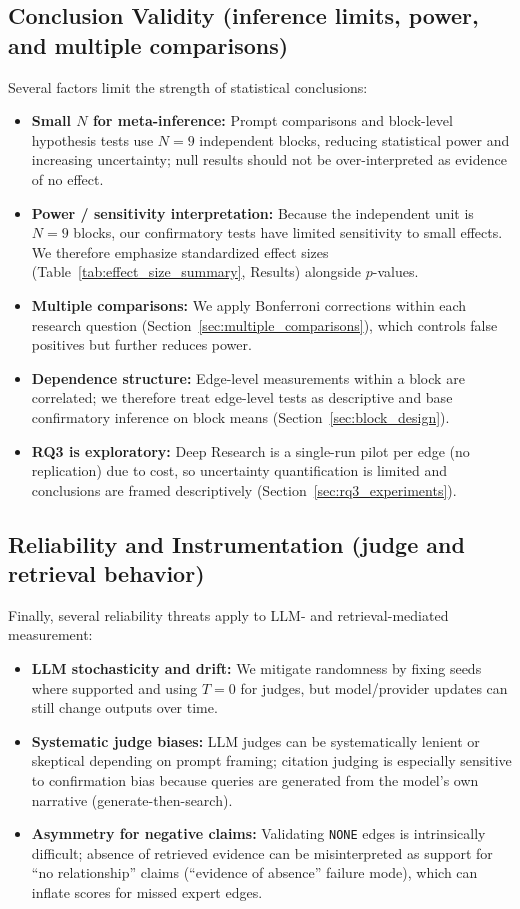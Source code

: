 \subsection{Conclusion Validity (inference limits, power, and multiple comparisons)}
Several factors limit the strength of statistical conclusions:
\begin{itemize}[noitemsep]
    \item \textbf{Small $N$ for meta-inference:} Prompt comparisons and block-level hypothesis tests use $N=9$ independent blocks, reducing statistical power and increasing uncertainty; null results should not be over-interpreted as evidence of no effect.
    \item \textbf{Power / sensitivity interpretation:} Because the independent unit is $N{=}9$ blocks, our confirmatory tests have limited sensitivity to small effects. We therefore emphasize standardized effect sizes (Table~\ref{tab:effect_size_summary}, Results) alongside $p$-values.
    \item \textbf{Multiple comparisons:} We apply Bonferroni corrections within each research question (Section~\ref{sec:multiple_comparisons}), which controls false positives but further reduces power.
    \item \textbf{Dependence structure:} Edge-level measurements within a block are correlated; we therefore treat edge-level tests as descriptive and base confirmatory inference on block means (Section~\ref{sec:block_design}).
    \item \textbf{RQ3 is exploratory:} Deep Research is a single-run pilot per edge (no replication) due to cost, so uncertainty quantification is limited and conclusions are framed descriptively (Section~\ref{sec:rq3_experiments}).
\end{itemize}

\subsection{Reliability and Instrumentation (judge and retrieval behavior)}
Finally, several reliability threats apply to LLM- and retrieval-mediated measurement:
\begin{itemize}[noitemsep]
    \item \textbf{LLM stochasticity and drift:} We mitigate randomness by fixing seeds where supported and using $T{=}0$ for judges, but model/provider updates can still change outputs over time.
    \item \textbf{Systematic judge biases:} LLM judges can be systematically lenient or skeptical depending on prompt framing; citation judging is especially sensitive to confirmation bias because queries are generated from the model's own narrative (generate-then-search).
    \item \textbf{Asymmetry for negative claims:} Validating \texttt{NONE} edges is intrinsically difficult; absence of retrieved evidence can be misinterpreted as support for ``no relationship'' claims (``evidence of absence'' failure mode), which can inflate scores for missed expert edges.
\end{itemize}

